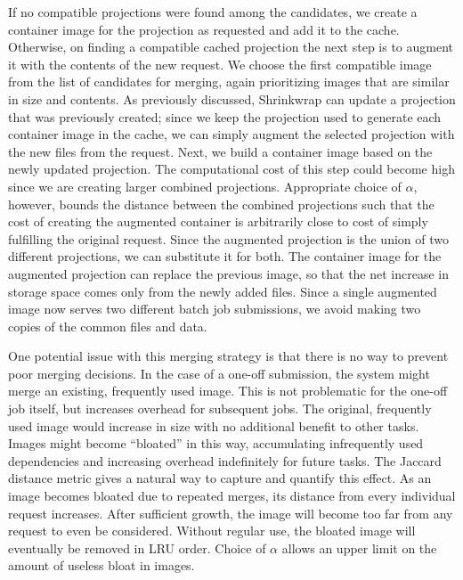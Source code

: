 \documentclass[sigconf]{acmart}
\begin{document}
If no compatible projections were found among the candidates,
we create a container image for the projection as requested and add it to the cache.
Otherwise, on finding a compatible cached projection the next step is to augment it with the contents of the new request.
We choose the first compatible image from the list of candidates for merging,
again prioritizing images that are similar in size and contents.
As previously discussed,
Shrinkwrap can update a projection that was previously created;
since we keep the projection used to generate each container image in the cache,
we can simply augment the selected projection with the new files from the request.
Next, we build a container image based on the newly updated projection.
The computational cost of this step could become high since we are creating larger combined projections.
Appropriate choice of $\alpha$, however,
bounds the distance between the combined projections such that the cost of creating the augmented container is arbitrarily close to cost of simply fulfilling the original request.
Since the augmented projection is the union of two different projections,
we can substitute it for both.
The container image for the augmented projection can replace the previous image,
so that the net increase in storage space comes only from the newly added files.
Since a single augmented image now serves two different batch job submissions,
we avoid making two copies of the common files and data.

One potential issue with this merging strategy is that there is no way to prevent poor merging decisions.
In the case of a one-off submission,
the system might merge an existing, frequently used image.
This is not problematic for the one-off job itself,
but increases overhead for subsequent jobs.
The original, frequently used image would increase in size with no additional benefit to other tasks.
Images might become ``bloated'' in this way,
accumulating infrequently used dependencies and increasing overhead indefinitely for future tasks.
The Jaccard distance metric gives a natural way to capture and quantify this effect.
As an image becomes bloated due to repeated merges,
its distance from every individual request increases.
After sufficient growth,
the image will become too far from any request to even be considered.
Without regular use,
the bloated image will eventually be removed in LRU order.
Choice of $\alpha$ allows an upper limit on the amount of useless bloat in images.
\end{document}
